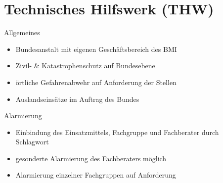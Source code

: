 \section{Technisches Hilfswerk (THW)}
\begin{sectionbox}{Allgemeines}
    \begin{itemize}
        \item Bundesanstalt mit eigenen Geschäftsbereich des BMI
        \item Zivil- \& Katastrophenschutz auf Bundesebene
        \item örtliche Gefahrenabwehr auf Anforderung der Stellen
        \item Auslandseinsätze im Auftrag des Bundes
    \end{itemize}
\end{sectionbox}
\begin{sectionbox}{Alarmierung}
    \begin{itemize}
        \item Einbindung des Einsatzmittels, Fachgruppe und Fachberater durch Schlagwort
        \item gesonderte Alarmierung des Fachberaters möglich
        \item Alarmierung einzelner Fachgruppen auf Anforderung
    \end{itemize}
\end{sectionbox}
